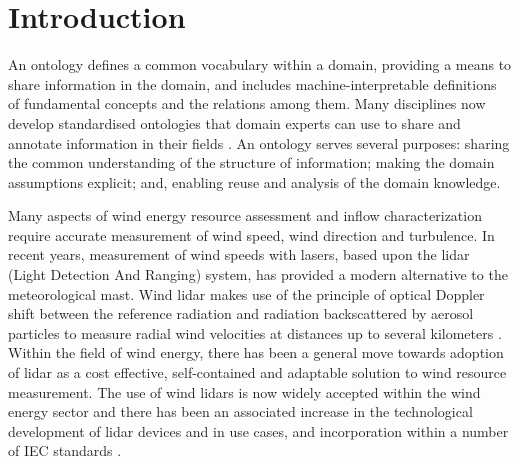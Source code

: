 \documentclass[remotesensing,article,submit,pdftex,moreauthors]{Definitions/mdpi}
\begin{document}



\section{Introduction}
An ontology defines a common vocabulary within a domain, providing a means to share information in the domain, and includes machine-interpretable definitions of fundamental concepts and the relations among them.
Many disciplines now develop standardised ontologies that domain experts can use to share and annotate information in their fields \cite{ref-Noy}.
An ontology serves several purposes: sharing the common understanding of the structure of information; making the domain assumptions explicit; and, enabling reuse and analysis of the domain knowledge.

Many aspects of wind energy resource assessment and inflow characterization require accurate measurement of wind speed, wind direction and turbulence. In recent years, measurement of wind speeds with lasers, based upon the lidar (Light Detection And Ranging) system, has provided a modern alternative to the meteorological mast. Wind lidar makes use of the principle of optical Doppler shift between the reference radiation and radiation backscattered by aerosol particles to measure radial wind velocities at distances up to several kilometers \cite{ref-Liu}.
Within the field of wind energy, there has been a general move towards adoption of lidar as a cost effective, self-contained and adaptable solution to wind resource measurement.
The use of wind lidars is now widely accepted within the wind energy sector and there has been an associated increase in the technological development of lidar devices and in use cases, and incorporation within a number of IEC standards \cite{ref-IEC61400-12-1, ref-IEC61400-50-3}.
\end{document}
